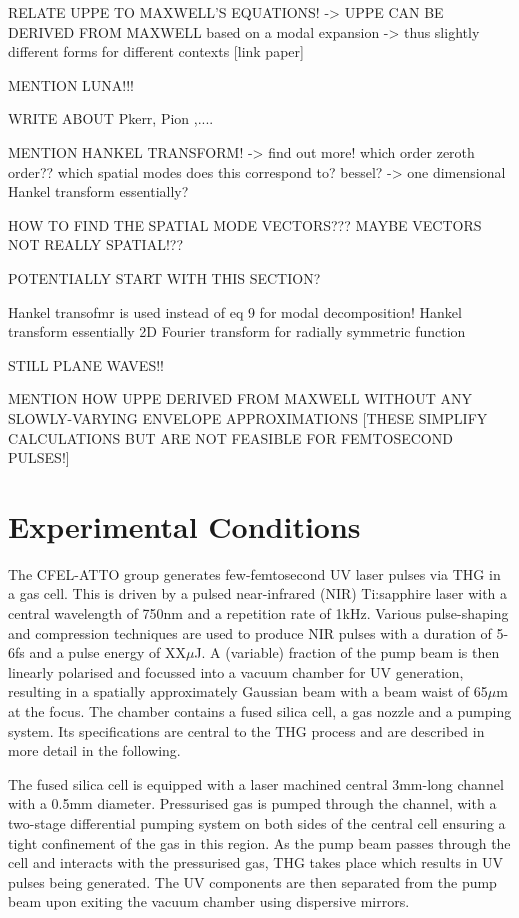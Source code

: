 \documentclass[a4paper]{jpconf}
\begin{document}
RELATE UPPE TO MAXWELL'S EQUATIONS!
		-> UPPE CAN BE DERIVED FROM MAXWELL based on a modal expansion  -> thus slightly different forms for different contexts [link paper]

MENTION LUNA!!!

WRITE ABOUT Pkerr, Pion ,....

MENTION HANKEL TRANSFORM! -> find out more! which order zeroth order?? which spatial modes does this correspond to? bessel? -> one dimensional Hankel transform essentially?

HOW TO FIND THE SPATIAL MODE VECTORS???
	MAYBE VECTORS NOT REALLY SPATIAL!??

POTENTIALLY START WITH THIS SECTION?

Hankel transofmr is used instead of eq 9 for modal decomposition! Hankel transform essentially 2D Fourier transform for radially symmetric function

STILL PLANE WAVES!!




MENTION HOW UPPE DERIVED FROM MAXWELL WITHOUT ANY SLOWLY-VARYING ENVELOPE APPROXIMATIONS [THESE SIMPLIFY CALCULATIONS BUT ARE NOT FEASIBLE FOR FEMTOSECOND PULSES!]

\section{Experimental Conditions}
The CFEL-ATTO group generates few-femtosecond UV laser pulses via THG in a gas cell. This is driven by a pulsed near-infrared (NIR) Ti:sapphire laser with a central wavelength of 750nm and a repetition rate of 1kHz. Various pulse-shaping and compression techniques are used to produce NIR pulses with a duration of 5-6fs and a pulse energy of XX$\mu$J. A (variable) fraction of the pump beam is then linearly polarised and focussed into a vacuum chamber for UV generation, resulting in a spatially approximately Gaussian beam with a beam waist of 65$\mu$m at the focus. The chamber contains a fused silica cell, a gas nozzle and a pumping system. Its specifications are central to the THG process and are described in more detail in the following. \par 
The fused silica cell is equipped with a laser machined central 3mm-long channel with a 0.5mm diameter. Pressurised gas is pumped through the channel, with a two-stage differential pumping system on both sides of the central cell ensuring a tight confinement of the gas in this region. As the pump beam passes through the cell and interacts with the pressurised gas, THG takes place which results in UV pulses being generated. The UV components are then separated from the pump beam upon exiting the vacuum chamber using dispersive mirrors. 
\end{document}
